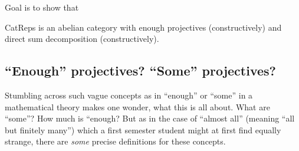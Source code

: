 Goal is to show that

CatReps is an abelian category with enough projectives (constructively) and direct sum decomposition (constructively).

\subsection{``Enough'' projectives? ``Some'' projectives?}
Stumbling across such vague concepts as in ``enough'' or ``some'' in a mathematical theory makes one wonder, what this is all about.
What are ``some''? How much is ``enough?
But as in the case of ``almost all'' (meaning ``all but finitely many'') which a first semester student might at first find equally strange, there
are \textit{some} precise definitions for these concepts.

\begin{definition}

\end{definition}

